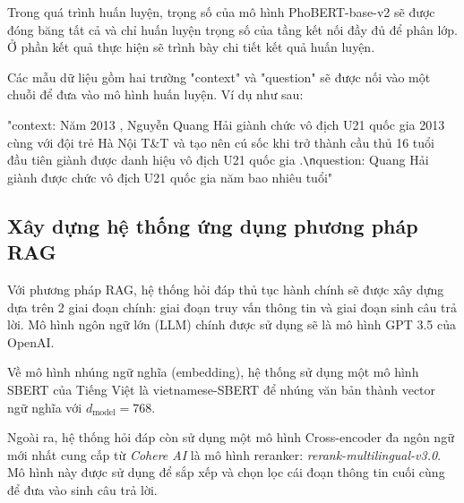 \documentclass[a4paper, 12pt, openany]{book}
\begin{document}
Trong quá trình huấn luyện, trọng số của mô hình PhoBERT-base-v2 sẽ được đóng băng tất cả và chỉ huấn luyện trọng số của tầng kết nối đầy đủ để phân lớp.
Ở phần kết quả thực hiện sẽ trình bày chi tiết kết quả huấn luyện.

Các mẫu dữ liệu gồm hai trường "context" và "question" sẽ được nối vào một chuỗi để đưa vào mô hình huấn luyện.
Ví dụ như sau:

"context: Năm 2013 , Nguyễn Quang Hải giành chức vô địch U21 quốc gia 2013 cùng với đội trẻ Hà Nội T\&T và tạo nên cú sốc khi trở thành cầu thủ 16 tuổi đầu tiên giành được danh hiệu vô địch U21 quốc gia .\verb|\n|question: Quang Hải giành được chức vô địch U21 quốc gia năm bao nhiêu tuổi"



\subsection{Xây dựng hệ thống ứng dụng phương pháp RAG}

Với phương pháp RAG, hệ thống hỏi đáp thủ tục hành chính sẽ được xây dựng dựa trên 2 giai đoạn chính: giai đoạn truy vấn thông tin và giai đoạn sinh câu trả lời.
Mô hình ngôn ngữ lớn (LLM) chính được sử dụng sẽ là mô hình GPT 3.5 của OpenAI.

Về mô hình nhúng ngữ nghĩa (embedding), hệ thống sử dụng một mô hình SBERT của Tiếng Việt là vietnamese-SBERT để nhúng văn bản thành vector ngữ nghĩa với
\(d_{\text{model}} = 768\).

Ngoài ra, hệ thống hỏi đáp còn sử dụng một mô hình Cross-encoder đa ngôn ngữ mới nhất cung cấp từ \textit{Cohere AI} là mô hình reranker: 
\textit{rerank-multilingual-v3.0}. Mô hình này được sử dụng để sắp xếp và chọn lọc cái đoạn thông tin cuối cùng để đưa vào sinh câu trả lời.
\end{document}
